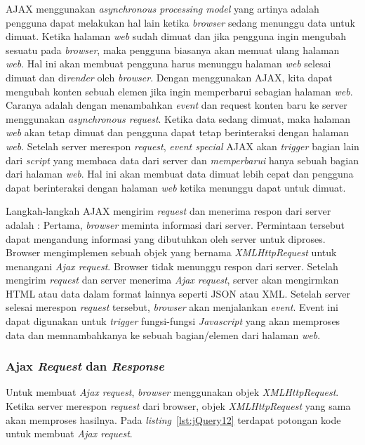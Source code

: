 AJAX menggunakan \textit{asynchronous processing model} yang artinya adalah pengguna dapat melakukan hal lain ketika \textit{browser} sedang menunggu data untuk dimuat. Ketika halaman \textit{web} sudah dimuat dan jika pengguna ingin mengubah sesuatu pada \textit{browser}, maka pengguna biasanya akan memuat ulang halaman \textit{web}. Hal ini akan membuat pengguna harus menunggu halaman \textit{web} selesai dimuat dan di\textit{render} oleh \textit{browser}. Dengan menggunakan AJAX, kita dapat mengubah konten sebuah elemen jika ingin memperbarui sebagian halaman \textit{web}. Caranya adalah dengan menambahkan \textit{event} dan request konten baru ke server menggunakan \textit{asynchronous request}. Ketika data sedang dimuat, maka halaman \textit{web} akan tetap dimuat dan pengguna dapat tetap berinteraksi dengan halaman \textit{web}. Setelah server merespon \textit{request}, \textit{event special} AJAX akan \textit{trigger} bagian lain dari \textit{script} yang membaca data dari server dan \textit{memperbarui} hanya sebuah bagian dari halaman \textit{web}. Hal ini akan membuat data dimuat lebih cepat dan pengguna dapat berinteraksi dengan halaman \textit{web} ketika menunggu dapat untuk dimuat.

Langkah-langkah AJAX mengirim \textit{request} dan menerima respon dari server adalah : Pertama, \textit{browser} meminta informasi dari server. Permintaan tersebut dapat mengandung informasi yang dibutuhkan oleh server untuk diproses. Browser mengimplemen sebuah objek yang bernama \textit{XMLHttpRequest} untuk menangani \textit{Ajax request}. Browser tidak menunggu respon dari server. Setelah mengirim \textit{request} dan server menerima \textit{Ajax request}, server akan mengirmkan HTML atau data dalam format lainnya seperti JSON atau XML. Setelah server selesai merespon \textit{request} tersebut, \textit{browser} akan menjalankan \textit{event}. Event ini dapat digunakan untuk \textit{trigger} fungsi-fungsi \textit{Javascript} yang akan memproses data dan memnambahkanya ke sebuah bagian/elemen dari halaman \textit{web}.

\subsubsection{Ajax \textit{Request} dan \textit{Response}}
Untuk membuat \textit{Ajax request}, \textit{browser} menggunakan objek \textit{XMLHttpRequest}. Ketika server merespon \textit{request} dari browser, objek \textit{XMLHttpRequest} yang sama akan memproses hasilnya. Pada \textit{listing}~\ref{lst:jQuery12} terdapat potongan kode untuk membuat \textit{Ajax request}. 

